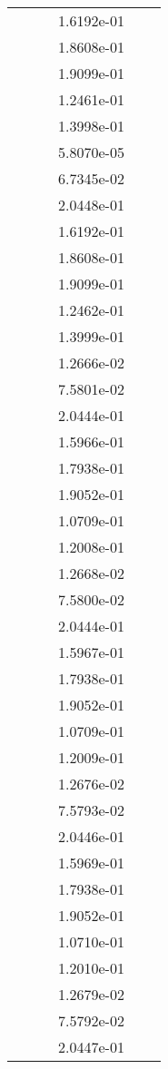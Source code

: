 \begin{xltabular}{\textwidth}{r|rS[table-format=1.3e+2]S[table-format=1.4e+2]S[table-format=1.4e+2]S[table-format=-1.5]}
&  &  & 1.6192e-01 & & \\
&  &  & 1.8608e-01 & & \\
&  &  & 1.9099e-01 & & \\
&  &  & 1.2461e-01 & & \\
&  &  & 1.3998e-01 & & \\
&  &  & 5.8070e-05 & & \\
&  &  & 6.7345e-02 & & \\
&  &  & 2.0448e-01 & & \\
&  &  & 1.6192e-01 & & \\
&  &  & 1.8608e-01 & & \\
&  &  & 1.9099e-01 & & \\
&  &  & 1.2462e-01 & & \\
&  &  & 1.3999e-01 & & \\
&  &  & 1.2666e-02 & & \\
&  &  & 7.5801e-02 & & \\
&  &  & 2.0444e-01 & & \\
&  &  & 1.5966e-01 & & \\
&  &  & 1.7938e-01 & & \\
&  &  & 1.9052e-01 & & \\
&  &  & 1.0709e-01 & & \\
&  &  & 1.2008e-01 & & \\
&  &  & 1.2668e-02 & & \\
&  &  & 7.5800e-02 & & \\
&  &  & 2.0444e-01 & & \\
&  &  & 1.5967e-01 & & \\
&  &  & 1.7938e-01 & & \\
&  &  & 1.9052e-01 & & \\
&  &  & 1.0709e-01 & & \\
&  &  & 1.2009e-01 & & \\
&  &  & 1.2676e-02 & & \\
&  &  & 7.5793e-02 & & \\
&  &  & 2.0446e-01 & & \\
&  &  & 1.5969e-01 & & \\
&  &  & 1.7938e-01 & & \\
&  &  & 1.9052e-01 & & \\
&  &  & 1.0710e-01 & & \\
&  &  & 1.2010e-01 & & \\
&  &  & 1.2679e-02 & & \\
&  &  & 7.5792e-02 & & \\
&  &  & 2.0447e-01 & & \\

\end{xltabular}
